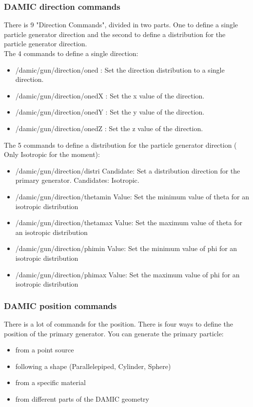 \documentclass[français,final,twoside,12pt]{article}
\begin{document}
\subsubsection{DAMIC direction commands}
There is 9 "Direction Commands", divided in two parts. One to define a single particle generator direction and the second to define a distribution for the particle generator direction.\\

The 4 commands to define a single direction:\\
\begin{itemize}
\item /damic/gun/direction/oned : Set the direction distribution to a single direction.
\item /damic/gun/direction/onedX : Set the x value of the direction.
\item /damic/gun/direction/onedY : Set the y value of the direction.
\item /damic/gun/direction/onedZ : Set the z value of the direction.
\newline
\end{itemize}


The 5 commands to define a distribution for the particle generator direction ( Only Isotropic for the moment):
\begin{itemize}
\item /damic/gun/direction/distri Candidate:  Set a distribution direction for the primary generator. Candidates: Isotropic.
\item /damic/gun/direction/thetamin Value: Set the minimum value of theta for an isotropic distribution
\item /damic/gun/direction/thetamax Value: Set the maximum value of theta for an isotropic distribution
\item /damic/gun/direction/phimin Value: Set the minimum value of phi for an isotropic distribution
\item /damic/gun/direction/phimax Value: Set the maximum value of phi for an isotropic distribution
\end{itemize}

\subsubsection{DAMIC position commands}

There is  a lot of commands for the position. There is four ways to define the position of the primary generator. You can generate the primary particle:
\begin{itemize}
\item from a point source
\item following a shape (Parallelepiped, Cylinder, Sphere)
\item from a specific material
\item from different parts of the DAMIC geometry
\newline
\end{itemize}
\end{document}
